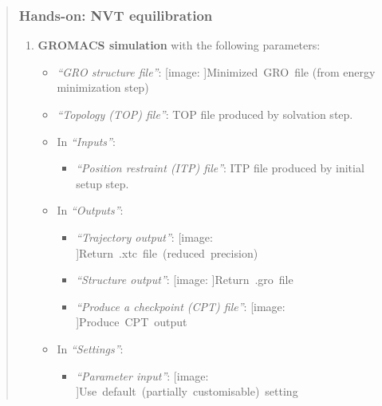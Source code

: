 \documentclass[twocolumn]{bmcart}%
\def\texttt{[image: ]}
\providecommand{\tightlist}{%
  \setlength{\itemsep}{0pt}\setlength{\parskip}{0pt}}
\begin{document}
\begin{quote}
\hypertarget{hands-on-nvt-equilibration}{%
\subsubsection{Hands-on: NVT
equilibration}\label{hands-on-nvt-equilibration}}

\begin{enumerate}
\def\labelenumi{\arabic{enumi}.}
\tightlist
\item
  \textbf{GROMACS simulation} with the following parameters:

  \begin{itemize}
  \tightlist
  \item
    \emph{``GRO structure file''}: \texttt{Minimized\ GRO\ file} (from
    energy minimization step)
  \item
    \emph{``Topology (TOP) file''}: TOP file produced by solvation step.
  \item
    In \emph{``Inputs''}:

    \begin{itemize}
    \tightlist
    \item
      \emph{``Position restraint (ITP) file''}: ITP file produced by
      initial setup step.
    \end{itemize}
  \item
    In \emph{``Outputs''}:

    \begin{itemize}
    \tightlist
    \item
      \emph{``Trajectory output''}:
      \texttt{Return\ .xtc\ file\ (reduced\ precision)}
    \item
      \emph{``Structure output''}: \texttt{Return\ .gro\ file}
    \item
      \emph{``Produce a checkpoint (CPT) file''}:
      \texttt{Produce\ CPT\ output}
    \end{itemize}
  \item
    In \emph{``Settings''}:

    \begin{itemize}
    \tightlist
    \item
      \emph{``Parameter input''}:
      \texttt{Use\ default\ (partially\ customisable)\ setting}


\end{itemize}
\end{itemize}
\end{enumerate}
\end{quote}
\end{document}
